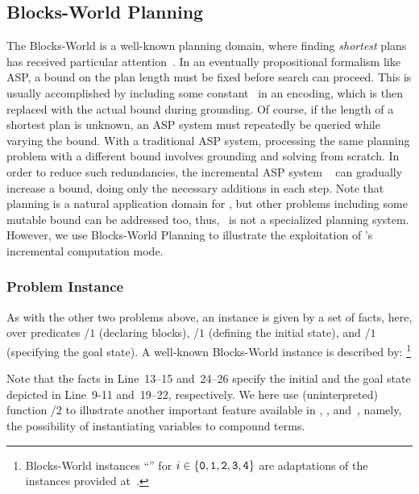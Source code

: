 \subsection{Blocks-World Planning}\label{subsec:ex:block}

The Blocks-World is a well-known planning domain,
where finding \emph{shortest} plans has received particular attention~\cite{gupnau92a}.
In an eventually propositional formalism like ASP,
a bound on the plan length must be fixed before search can proceed.
This is usually accomplished by including some constant~
in an encoding, which is then replaced with the actual bound during grounding.
Of course, if the length of a shortest plan is unknown,
an ASP system must repeatedly be queried while varying the bound.
With a traditional ASP system, processing
the same planning problem with a different bound
involves grounding and solving from scratch.
In order to reduce such redundancies,
the incremental ASP system \iclingo~\cite{gekakaosscth08a}
can gradually increase a bound, %
doing only the necessary additions in each step.
Note that planning is a natural application domain for \iclingo,
but other problems including some mutable bound can be addressed too, thus,
\iclingo\ is not a specialized planning system.
However, we use Blocks-World Planning to illustrate the exploitation of
\iclingo's incremental computation mode.


\subsubsection{Problem Instance}\label{subsec:block:instance}

As with the other two problems above,
an instance is given by a set of facts, here,
over predicates /$1$ (declaring blocks),
/$1$ (defining the initial state), and
/$1$ (specifying the goal state).
A well-known Blocks-World instance is described by:%
\footnote{%
  Blocks-World instances ``'' for
  $i\in\{\texttt{0},\texttt{1},\texttt{2},\texttt{3},\texttt{4}\}$
  are adaptations of the instances provided at~\cite{erdemBW}.}
%

%
Note that the facts in Line~13--15 and~24--26 specify the initial
and the goal state depicted in Line~9-11 and~19--22, respectively.
We here use (uninterpreted) function /$2$ to illustrate another
important feature available in \gringo, \clingo, and~\iclingo, namely,
the possibility of instantiating variables to compound terms.


